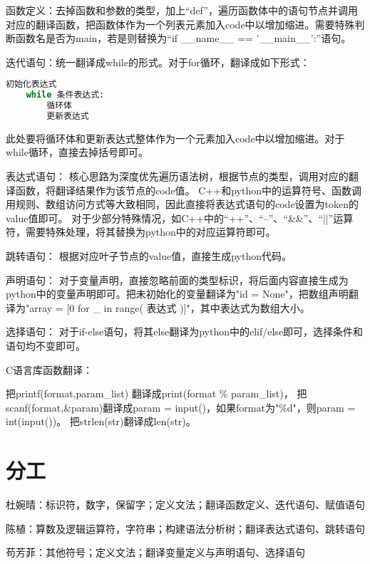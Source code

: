 \documentclass{article}
\begin{document}
函数定义：去掉函数和参数的类型，加上“def”，遍历函数体中的语句节点并调用对应的翻译函数，把函数体作为一个列表元素加入code中以增加缩进。需要特殊判断函数名是否为main，若是则替换为“if \_\_name\_\_ == '\_\_main\_\_':”语句。

迭代语句：统一翻译成while的形式。对于for循环，翻译成如下形式：
\begin{lstlisting}[language=Python]
    初始化表达式
    while 条件表达式:
        循环体
        更新表达式
\end{lstlisting}
此处要将循环体和更新表达式整体作为一个元素加入code中以增加缩进。对于while循环，直接去掉括号即可。

表达式语句：
核心思路为深度优先遍历语法树，根据节点的类型，调用对应的翻译函数，将翻译结果作为该节点的code值。
C++和python中的运算符号、函数调用规则、数组访问方式等大致相同，因此直接将表达式语句的code设置为token的value值即可。
对于少部分特殊情况，如C++中的“++”、“--”、“\&\&”、“||”运算符，需要特殊处理，将其替换为python中的对应运算符即可。


跳转语句：
根据对应叶子节点的value值，直接生成python代码。

声明语句：
对于变量声明，直接忽略前面的类型标识，将后面内容直接生成为python中的变量声明即可。把未初始化的变量翻译为"id = None"，把数组声明翻译为"array = [0 for \_ in range( 表达式 )]"，其中表达式为数组大小。

选择语句：
对于if-else语句，将其else翻译为python中的elif/else即可，选择条件和语句均不变即可。

C语言库函数翻译：

把printf(format,param\_list)
翻译成print(format \% param\_list)，
把scanf(format,\&param)翻译成param = input()，如果format为"\%d"，则param = int(input())。
把strlen(str)翻译成len(str)。

\section{分工}
杜婉晴：标识符，数字，保留字；定义文法；翻译函数定义、迭代语句、赋值语句

陈植：算数及逻辑运算符，字符串；构建语法分析树；翻译表达式语句、跳转语句

苟芳菲：其他符号；定义文法；翻译变量定义与声明语句、选择语句
\end{document}
